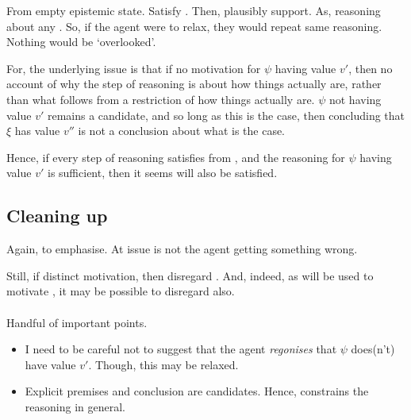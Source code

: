 \begin{note}
  From empty epistemic state.
  Satisfy \ideaCS{}.
  Then, plausibly support.
  As, reasoning about any \requ{}.
  So, if the agent were to relax, they would repeat same reasoning.
  Nothing would be `overlooked'.
\end{note}

\begin{note}
  \color{red}
  For, the underlying issue is that if no motivation for \(\psi\) having value \(v'\), then no account of why the step of reasoning is about how things actually are, rather than what follows from a restriction of how things actually are.
  \(\psi\) not having value \(v'\) remains a candidate, and so long as this is the case, then concluding that \(\xi\) has value \(v''\) is not a conclusion about what is the case.

  Hence, if every step of reasoning satisfies \ideaCS{} from \epPAd{} \world{}, and the reasoning for \(\psi\) having value \(v'\) is sufficient, then it seems \ideaS{} will also be satisfied.
\end{note}

\subsection{Cleaning up}
\label{sec:cleaning-up}

\begin{note}
  Again, to emphasise.
  At issue is not the agent getting something wrong.

  Still, if distinct motivation, then disregard \ideaS{}.
  And, indeed, as \ideaCS{} will be used to motivate \ideaCSC{}, it may be possible to disregard \ideaCS{} also.
\end{note}

\paragraph{\ideaCS{}}

\begin{note}
  Handful of important points.
  \begin{itemize}
  \item I need to be careful not to suggest that the agent \emph{regonises} that \(\psi\) does(n't) have value \(v'\).
    Though, this may be relaxed.
  \item Explicit premises and conclusion are candidates.
  Hence, \label{idea:CS:B:step:requ} constrains the reasoning in general.
  \end{itemize}
\end{note}

